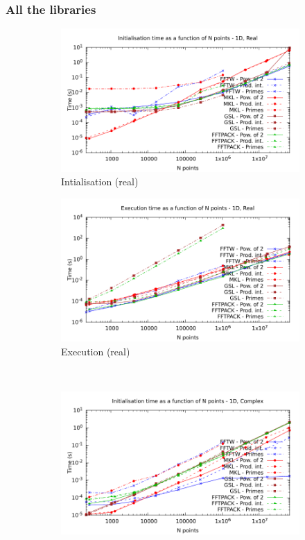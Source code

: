 \documentclass[12pt, a4paper]{article}
\begin{document}
\subsubsection{All the libraries}
\begin{figure}[H]
\captionsetup{width=0.8\linewidth}
\centering
\begin{subfigure}{.5\textwidth}
\centering
\includegraphics[width=.9\linewidth]{graphs/1d-init-r.pdf}
\caption{Intialisation (real)}
\label{1DRI}
\end{subfigure}%
\begin{subfigure}{.5\textwidth}
\centering
\includegraphics[width=.9\linewidth]{graphs/1d-exec-r.pdf}
\caption{Execution (real)}
\label{1DR}
\end{subfigure}\\
\begin{subfigure}{.5\textwidth}
\centering
\includegraphics[width=.9\linewidth]{graphs/1d-init-c.pdf}

\end{subfigure}
\end{figure}
\end{document}
